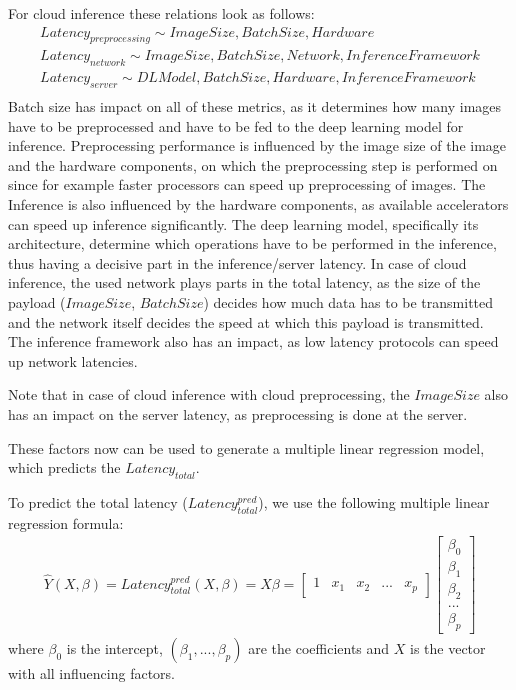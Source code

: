 For cloud inference these relations look as follows:
\begin{equation*}
\begin{gathered}
 Latency_{preprocessing}\sim ImageSize, BatchSize, Hardware\\
 Latency_{network}\sim ImageSize, BatchSize, Network, Inference Framework\\
 Latency_{server} \sim DLModel, BatchSize, Hardware, Inference Framework\\
\end{gathered}
\end{equation*}
Batch size has impact on all of these metrics, as it determines how many images have to be preprocessed and have to be fed to the deep learning model for inference.
Preprocessing performance is influenced by the image size of the image and the hardware components, on which the preprocessing step is performed on since for example faster processors can speed up preprocessing of images.
The Inference is also influenced by the hardware components, as available accelerators can speed up inference significantly. 
The deep learning model, specifically its architecture, determine which operations have to be performed in the inference, thus having a decisive part in the inference/server latency.
In case of cloud inference, the used network plays parts in the total latency, as the size of the payload ($ImageSize$, $BatchSize$) decides how much data has to be transmitted and the network itself decides the speed at which this payload is transmitted. The inference framework also has an impact, as low latency protocols can speed up network latencies.

Note that in case of cloud inference with cloud preprocessing, the $ImageSize$ also has an impact on the server latency, as preprocessing is done at the server.


These factors now can be used to generate a multiple linear regression model, which predicts the $Latency_{total}$.


To predict the total latency ($Latency_{total}^{pred}$), we use the following multiple linear regression formula:
\begin{equation} \label{eq:regression}
\begin{gathered}
\hat{Y}(X,\beta) = Latency_{total}^{pred}(X,\beta) = X \beta = \begin{bmatrix} 1 &x_{1} & x_{2}& ...& x_{p} \end{bmatrix} \begin{bmatrix}
           \beta_{0} \\
           \beta_{1} \\
           \beta_{2} \\
           ... \\
           \beta_{p}
         \end{bmatrix} 
\end{gathered}
\end{equation}
where $\beta_0$ is the intercept, $(\beta_1,...,\beta_p)$ are the coefficients and $X$ is the vector with all influencing factors.

